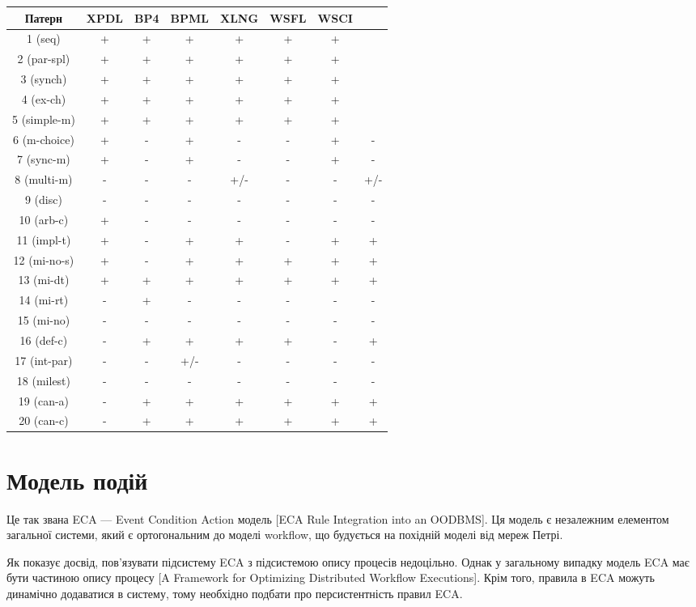 \documentclass{memoir}
\begin{document}
\begin{tabular}{|c|c|c|c|c|c|c|c|}
\hline
Патерн & XPDL & BP4 & BPML & XLNG & WSFL & WSCI \\
\hline
1 (seq) & + & + & + & + & + & + \\
2 (par-spl) & + & + & + & + & + & + \\
3 (synch) & + & + & + & + & + & + \\
4 (ex-ch) & + & + & + & + & + & + \\
5 (simple-m) & + & + & + & + & + & + \\
6 (m-choice) & + & - & + & - & - & + & - \\
7 (sync-m) & + & - & + & - & - & + & - \\
8 (multi-m) & - & - & - & +/- & - & - & +/- \\
9 (disc) & - & - & - & - & - & - & - \\
10 (arb-c) & + & - & - & - & - & - & - \\
11 (impl-t) & + & - & + & + & - & + & + \\
12 (mi-no-s) & + & - & + & + & + & + & + \\
13 (mi-dt) & + & + & + & + & + & + & + \\
14 (mi-rt) & - & + & - & - & - & - & - \\
15 (mi-no) & - & - & - & - & - & - & - \\
16 (def-c) & - & + & + & + & + & - & + \\
17 (int-par) & - & - & +/- & - & - & - & - \\
18 (milest) & - & - & - & - & - & - & - \\
19 (can-a) & - & + & + & + & + & + & + \\
20 (can-c) & - & + & + & + & + & + & + \\
\hline
\end{tabular}

\section{Модель подій}

Це так звана ECA — Event Condition Action модель [ECA Rule Integration into an OODBMS]. Ця модель є незалежним елементом загальної системи, який є ортогональним до моделі workflow, що будується на похідній моделі від мереж Петрі.

Як показує досвід, пов’язувати підсистему ECA з підсистемою опису процесів недоцільно. Однак у загальному випадку модель ECA має бути частиною опису процесу [A Framework for Optimizing Distributed Workflow Executions]. Крім того, правила в ECA можуть динамічно додаватися в систему, тому необхідно подбати про персистентність правил ECA.
\end{document}
